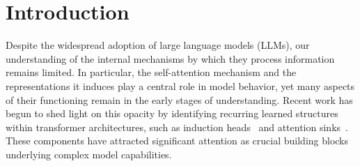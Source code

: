 \documentclass{article}
\theoremstyle{plain}
\theoremstyle{definition}
\theoremstyle{remark}
\begin{document}
\begin{abstract}
Understanding the intricate non-convex training dynamics of softmax-based models is crucial for explaining the empirical success of transformers. In this article, we analyze the gradient flow dynamics of the \emph{value-softmax} model, defined as $\mathcal{L}(\mathbf{V} \sigma(\mathbf{a}))$, where $\mathbf{V}$ and $\mathbf{a}$ are a learnable value matrix and attention vector, respectively. As the \emph{matrix times softmax vector} parameterization constitutes the core building block of self-attention, our analysis provides direct insight into transformer's training dynamics. We reveal that gradient flow on this structure inherently drives the optimization toward solutions characterized by low-entropy outputs. We demonstrate the universality of this polarizing effect across various objectives, including logistic and square loss. Furthermore, we discuss the practical implications of these theoretical results, offering a formal mechanism for empirical phenomena such as \emph{attention sinks} and \emph{massive activations}.
\end{abstract}

\section{Introduction}

Despite the widespread adoption of large language models (LLMs), our understanding of the internal mechanisms by which they process information remains limited. In particular, the self-attention mechanism and the representations it induces play a central role in model behavior, yet many aspects of their functioning remain in the early stages of understanding. Recent work has begun to shed light on this opacity by identifying recurring learned structures within transformer architectures, such as induction heads~\citep{olsson2022context} and attention sinks~\citep{xiao2024efficient}. These components have attracted significant attention as crucial building blocks underlying complex model capabilities.
\end{document}
